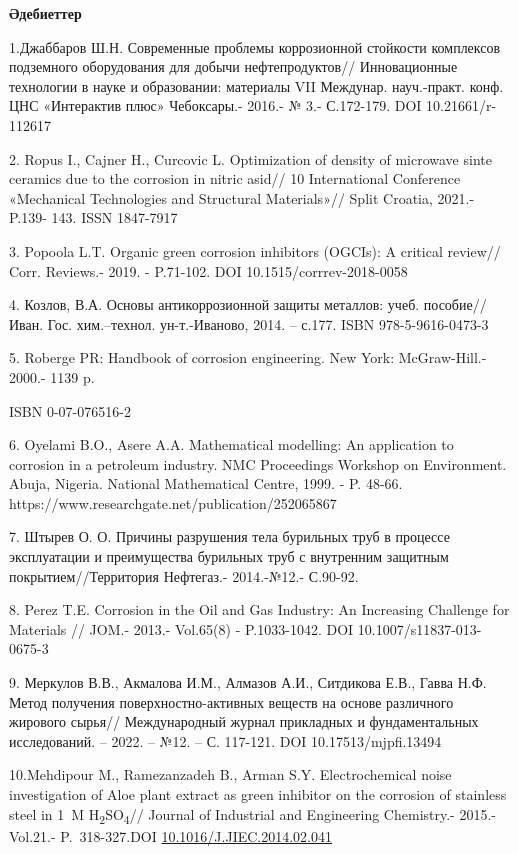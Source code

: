 \begin{center}
	{\bfseries Әдебиеттер}
	\end{center}
	
	\begin{noparindent}

1.Джаббаров Ш.Н. Современные проблемы коррозионной стойкости комплексов
подземного оборудования для добычи нефтепродуктов// Инновационные
технологии в науке и образовании: материалы VII Междунар. науч.-практ.
конф. ЦНС «Интерактив плюс» Чебоксары.- 2016.- № 3.- С.172-179. DOI
10.21661/r-112617

2. Ropus I., Cajner H., Curcovic L. Optimization of density of microwave
sinte ceramics due to the corrosion in nitric asid// 10 International
Conference «Mechanical Technologies and Structural Materials»// Split
Croatia, 2021.- P.139- 143. ISSN 1847-7917

3. Popoola L.T. Organic green corrosion inhibitors (OGCIs): A critical
review// Corr. Reviews.- 2019. - P.71-102. DOI 10.1515/corrrev-2018-0058

4. Козлов, В.А. Основы антикоррозионной защиты металлов: учеб.
пособие//Иван. Гос. хим.--технол. ун-т.-Иваново, 2014. -- с.177. ISBN
978-5-9616-0473-3

5. Roberge PR: Handbook of corrosion engineering. New York:
McGraw-Hill.- 2000.- 1139 p.

ISBN 0-07-076516-2

6. Oyelami B.O., Asere A.A. Mathematical modelling: An application to
corrosion in a petroleum industry. NMC Proceedings Workshop on
Environment. Abuja, Nigeria. National Mathematical Centre, 1999. - P.
48-66. https://www.researchgate.net/publication/252065867

7. Штырев О. О. Причины разрушения тела бурильных труб в процессе
эксплуатации и преимущества бурильных труб с внутренним защитным
покрытием//Территория Нефтегаз.- 2014.-№12.- С.90-92.

8. Perez T.E. Corrosion in the Oil and Gas Industry: An Increasing
Challenge for Materials // JOM.- 2013.- Vol.65(8) - P.1033-1042. DOI
10.1007/s11837-013-0675-3

9. Меркулов В.В., Акмалова И.М., Алмазов А.И., Ситдикова Е.В., Гавва
Н.Ф. Метод получения поверхностно-активных веществ на основе различного
жирового сырья// Международный журнал прикладных и фундаментальных
исследований. -- 2022. -- №12. -- С. 117-121. DOI 10.17513/mjpfi.13494

10.Mehdipour M., Ramezanzadeh B., Arman S.Y. Electrochemical noise
investigation of Aloe plant extract as green inhibitor on the corrosion
of stainless steel in 1~M H\textsubscript{2}SO\textsubscript{4}//
Journal of Industrial and Engineering Chemistry.- 2015.-Vol.21.-
P.~318-327.DOI \href{https://doi.org/10.1016/J.JIEC.2014.02.041}{10.1016/J.JIEC.2014.02.041}

\end{noparindent}

